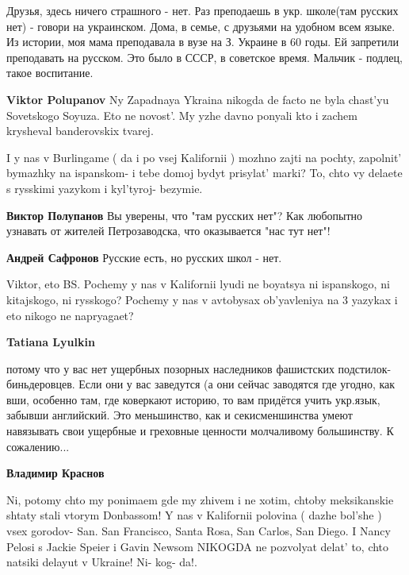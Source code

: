 \begin{itemize}

Друзья, здесь ничего страшного - нет. Раз преподаешь в укр. школе(там русских нет)
- говори на украинском. Дома, в семье, с друзьями на удобном всем языке. Из
истории, моя мама преподавала в вузе на З. Украине в 60 годы. Ей запретили
преподавать на русском. Это было в СССР, в советское время. Мальчик - подлец, такое
воспитание.

\begin{itemize} %
\textbf{Viktor Polupanov} Ny Zapadnaya Ykraina nikogda de facto ne byla chast'yu Sovetskogo Soyuza. Eto ne novost'. My yzhe davno ponyali kto i zachem krysheval banderovskix tvarej.


I y nas v Burlingame ( da i po vsej Kalifornii ) mozhno zajti na pochty,
zapolnit' bymazhky na ispanskom- i tebe domoj bydyt prisylat' marki? To, chto
vy delaete s rysskimi yazykom i kyl'tyroj- bezymie.


\textbf{Виктор Полупанов} Вы уверены, что "там русских нет"? Как любопытно узнавать от жителей Петрозаводска, что оказывается "нас тут нет"!

\textbf{Андрей Сафронов} Русские есть, но русских школ - нет.
\end{itemize} %


Viktor, eto BS. Pochemy y nas v Kalifornii lyudi ne boyatsya ni ispanskogo, ni
kitajskogo, ni rysskogo? Pochemy y nas v avtobysax ob'yavleniya na 3 yazykax i
eto nikogo ne napryagaet?

\begin{itemize} %
\textbf{Tatiana Lyulkin} 

потому что у вас нет ущербных позорных наследников фашистских
подстилок-биньдеровцев. Если они у вас заведутся (а они сейчас заводятся где
угодно, как вши, особенно там, где коверкают историю, то вам придётся учить
укр.язык, забывши английский. Это меньшинство, как и секисменшинства умеют
навязывать свои ущербные и греховные ценности молчаливому большинству. К
сожалению...


\textbf{Владимир Краснов} 

Ni, potomy chto my ponimaem gde my zhivem i ne xotim, chtoby meksikanskie
shtaty stali vtorym Donbassom! Y nas v Kalifornii polovina ( dazhe bol'she )
vsex gorodov- San. San Francisco, Santa Rosa, San Carlos, San Diego. I Nancy
Pelosi s Jackie Speier i Gavin Newsom NIKOGDA ne pozvolyat delat' to, chto
natsiki delayut v Ukraine! Ni- kog- da!.


\end{itemize}
\end{itemize}
